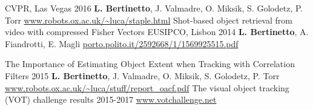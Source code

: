 \begin{cvpapers}
    {CVPR, Las Vegas} %
    {2016} %
  \cvpaperauthors
    {\textbf{L. Bertinetto}, J. Valmadre, O. Miksik, S. Golodetz, P. Torr}
    {} %
    {} %
  \cvpaperurl
    {\href{http://www.robots.ox.ac.uk/~luca/staple.html}{www.robots.ox.ac.uk/\textasciitilde luca/staple.html}}
    {} %
    {} %
  \cvpapertitle
    {Shot-based object retrieval from video with compressed Fisher Vectors} %
    {EUSIPCO, Lisbon} %
    {2014} %
  \cvpaperauthors
    {\textbf{L. Bertinetto}, A. Fiandrotti, E. Magli}
    {} %
    {} %
  \cvpaperurl
    {\href{http://porto.polito.it/2592668/1/1569925515.pdf}{porto.polito.it/2592668/1/1569925515.pdf}}
    {} %
    {} %

\end{cvpapers}

\newpage


\begin{cvpapers}
  \cvpapertitle
    {The Importance of Estimating Object Extent when Tracking with Correlation Filters} %
    {} %
    {2015} %
  \cvpaperauthors
    {\textbf{L. Bertinetto}, J. Valmadre,  O. Miksik, S. Golodetz, P. Torr}
    {} %
    {} %
  \cvpaperurl
    {\href{http://www.robots.ox.ac.uk/~luca/stuff/report_oacf.pdf}{www.robots.ox.ac.uk/\textasciitilde luca/stuff/report\_oacf.pdf}}
    {} %
    {} %
  \cvpapertitle
    {The visual object tracking (VOT) challenge results} %
    {} %
    {2015-2017} %
  \cvpaperurl
    {\href{http://www.votchallenge.net}{www.votchallenge.net}}
    {} %
    {} %

\end{cvpapers}
